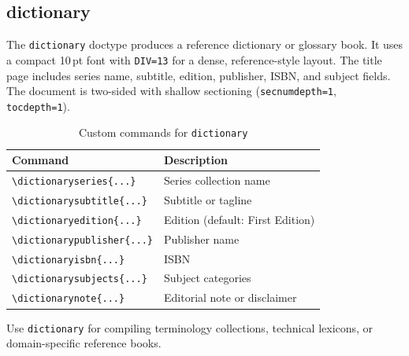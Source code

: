 \subsection{dictionary}

The \texttt{dictionary} doctype produces a reference dictionary or glossary
book.  It uses a compact 10\,pt font with \texttt{DIV=13} for a dense,
reference-style layout.  The title page includes series name, subtitle,
edition, publisher, ISBN, and subject fields.  The document is two-sided
with shallow sectioning (\texttt{secnumdepth=1}, \texttt{tocdepth=1}).

\begin{table}[htbp]
    \centering
    \caption{Custom commands for \texttt{dictionary}}
    \label{tab:dictionary-commands}
    \begin{tabular}{@{} l p{8cm} @{}}
        \toprule
        \textbf{Command} & \textbf{Description} \\
        \midrule
        \texttt{\textbackslash dictionaryseries\{...\}}     & Series collection name \\
        \texttt{\textbackslash dictionarysubtitle\{...\}}   & Subtitle or tagline \\
        \texttt{\textbackslash dictionaryedition\{...\}}    & Edition (default: First Edition) \\
        \texttt{\textbackslash dictionarypublisher\{...\}}  & Publisher name \\
        \texttt{\textbackslash dictionaryisbn\{...\}}       & ISBN \\
        \texttt{\textbackslash dictionarysubjects\{...\}}  & Subject categories \\
        \texttt{\textbackslash dictionarynote\{...\}}       & Editorial note or disclaimer \\
        \bottomrule
    \end{tabular}
\end{table}

Use \texttt{dictionary} for compiling terminology collections, technical
lexicons, or domain-specific reference books.

